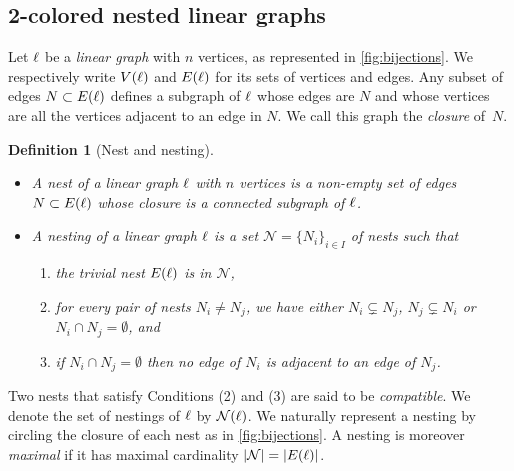 \documentclass[twoside, 11pt]{amsart}
\newtheorem{definition}{Definition}[section]
\theoremstyle{remark}
\begin{document}

\subsection{2-colored nested linear graphs} \label{ss:2-col}

Let $\ell$ be a \emph{linear graph} with $n$ vertices, as represented in \cref{fig:bijections}.
We respectively write $V(\ell)$ and $E(\ell)$ for its sets of vertices and edges.
Any subset of edges $N\subset E(\ell)$ defines a subgraph of $\ell$ whose edges are $N$ and whose vertices are all the vertices adjacent to an edge in $N$. 
We call this graph the \emph{closure} of~$N$. 

\begin{definition}[Nest and nesting]
\leavevmode
\begin{itemize}[leftmargin=*]
\item A \emph{nest} of a linear graph $\ell$ with $n$ vertices is a non-empty set of edges $N \subset E(\ell)$ whose closure is a connected subgraph of $\ell$.  
\item A \emph{nesting} of a linear graph $\ell$ is a set $\mathcal{N}=\{N_i\}_{i\in I}$ of nests such that 
\begin{enumerate}[leftmargin=*]
    \item the \emph{trivial nest} $E(\ell)$ is in $\mathcal{N}$,
    \item for every pair of nests $N_i\neq N_j$, we have either $N_i \subsetneq N_j$, $N_j \subsetneq N_i$ or $N_i \cap N_j = \emptyset$, and
    \item if $N_i \cap N_j = \emptyset$ then no edge of $N_i$ is adjacent to an edge of $N_j$.
\end{enumerate}
\end{itemize}
\end{definition}

Two nests that satisfy Conditions (2) and (3) are said to be \textit{compatible}. 
We denote the set of nestings of $\ell$ by $\mathcal{N}(\ell)$. 
We naturally represent a nesting by circling the closure of each nest as in \cref{fig:bijections}. 
A nesting is moreover \emph{maximal} if it has maximal cardinality $|\mathcal{N}|=|E(\ell)|$.
\end{document}
